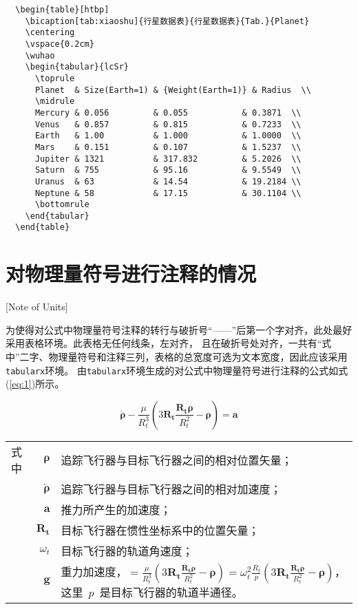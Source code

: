 \begin{lstlisting}
  \begin{table}[htbp]
    \bicaption[tab:xiaoshu]{行星数据表}{行星数据表}{Tab.}{Planet}
    \centering
    \vspace{0.2cm}
    \wuhao
    \begin{tabular}{lcSr}
      \toprule
      Planet  & Size(Earth=1) & {Weight(Earth=1)} & Radius  \\
      \midrule
      Mercury & 0.056         & 0.055           & 0.3871  \\
      Venus   & 0.857         & 0.815           & 0.7233  \\
      Earth   & 1.00          & 1.000           & 1.0000  \\
      Mars    & 0.151         & 0.107           & 1.5237  \\
      Jupiter & 1321          & 317.832         & 5.2026  \\
      Saturn  & 755           & 95.16           & 9.5549  \\
      Uranus  & 63            & 14.54           & 19.2184 \\
      Neptune & 58            & 17.15           & 30.1104 \\
      \bottomrule
    \end{tabular}
  \end{table}
\end{lstlisting}

\section{对物理量符号进行注释的情况}[Note of Units]

为使得对公式中物理量符号注释的转行与破折号“——”后第一个字对齐，此处最好采用表格环境。此表格无任何线条，左对齐，
且在破折号处对齐，一共有“式中”二字、物理量符号和注释三列，表格的总宽度可选为文本宽度，因此应该采用\verb|tabularx|环境。
由\verb|tabularx|环境生成的对公式中物理量符号进行注释的公式如式(\ref{eq:1})所示。

\begin{equation}\label{eq:1}
\ddot{\boldsymbol{\rho}}-\frac{\mu}{R_{t}^{3}}\left(3\mathbf{R_{t}}\frac{\mathbf{R_{t}\rho}}{R_{t}^{2}}-\boldsymbol{\rho}\right)=\mathbf{a}
\end{equation}
\begin{tabularx}{\textwidth}{@{}l@{\quad}r@{——}X@{}}
式中& $\boldsymbol{\rho}$ &追踪飞行器与目标飞行器之间的相对位置矢量；\\
&  $\boldsymbol{\ddot{\rho}}$&追踪飞行器与目标飞行器之间的相对加速度；\\
&  $\mathbf{a}$   &推力所产生的加速度；\\
&  $\mathbf{R_t}$ & 目标飞行器在惯性坐标系中的位置矢量；\\
&  $\omega_{t}$ & 目标飞行器的轨道角速度；\\
&  $\mathbf{g}$ & 重力加速度，$=\frac{\mu}{R_{t}^{3}}\left(
3\mathbf{R_{t}}\frac{\mathbf{R_{t}\rho}}{R_{t}^{2}}-\boldsymbol{\rho}\right)=\omega_{t}^{2}\frac{R_{t}}{p}\left(
3\mathbf{R_{t}}\frac{\mathbf{R_{t}\rho}}{R_{t}^{2}}-\boldsymbol{\rho}\right)$，这里~$p$~是目标飞行器的轨道半通径。
\end{tabularx}
\vspace{2em}

